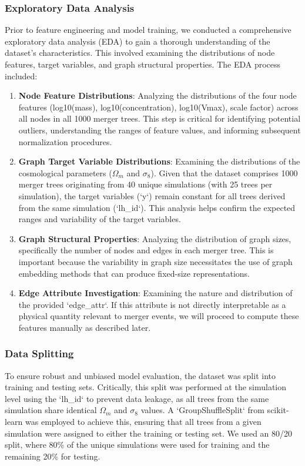 \documentclass[twocolumn]{aastex631}
\begin{document}
\subsubsection{Exploratory Data Analysis}
Prior to feature engineering and model training, we conducted a comprehensive exploratory data analysis (EDA) to gain a thorough understanding of the dataset's characteristics. This involved examining the distributions of node features, target variables, and graph structural properties. The EDA process included:

\begin{enumerate}
    \item \textbf{Node Feature Distributions}: Analyzing the distributions of the four node features (log10(mass), log10(concentration), log10(Vmax), scale factor) across all nodes in all 1000 merger trees. This step is critical for identifying potential outliers, understanding the ranges of feature values, and informing subsequent normalization procedures.
    \item \textbf{Graph Target Variable Distributions}: Examining the distributions of the cosmological parameters ($\Omega_m$ and $\sigma_8$). Given that the dataset comprises 1000 merger trees originating from 40 unique simulations (with 25 trees per simulation), the target variables (`y`) remain constant for all trees derived from the same simulation (`lh\_id`). This analysis helps confirm the expected ranges and variability of the target variables.
    \item \textbf{Graph Structural Properties}: Analyzing the distribution of graph sizes, specifically the number of nodes and edges in each merger tree. This is important because the variability in graph size necessitates the use of graph embedding methods that can produce fixed-size representations.
    \item \textbf{Edge Attribute Investigation}: Examining the nature and distribution of the provided `edge\_attr`. If this attribute is not directly interpretable as a physical quantity relevant to merger events, we will proceed to compute these features manually as described later.
\end{enumerate}

\subsubsection{Data Splitting}
To ensure robust and unbiased model evaluation, the dataset was split into training and testing sets. Critically, this split was performed at the simulation level using the `lh\_id` to prevent data leakage, as all trees from the same simulation share identical $\Omega_m$ and $\sigma_8$ values. A `GroupShuffleSplit` from scikit-learn was employed to achieve this, ensuring that all trees from a given simulation were assigned to either the training or testing set. We used an 80/20 split, where 80\% of the unique simulations were used for training and the remaining 20\% for testing.
\end{document}
